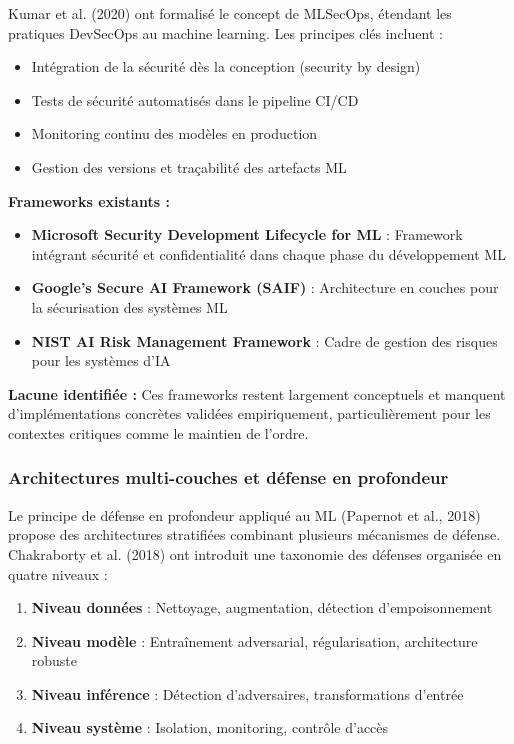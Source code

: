 Kumar et al. (2020) ont formalisé le concept de MLSecOps, étendant les pratiques DevSecOps au machine learning. Les principes clés incluent :
\begin{itemize}
    \item Intégration de la sécurité dès la conception (security by design)
    \item Tests de sécurité automatisés dans le pipeline CI/CD
    \item Monitoring continu des modèles en production
    \item Gestion des versions et traçabilité des artefacts ML
\end{itemize}

\textbf{Frameworks existants :}
\begin{itemize}
    \item \textbf{Microsoft Security Development Lifecycle for ML} : Framework intégrant sécurité et confidentialité dans chaque phase du développement ML
    \item \textbf{Google's Secure AI Framework (SAIF)} : Architecture en couches pour la sécurisation des systèmes ML
    \item \textbf{NIST AI Risk Management Framework} : Cadre de gestion des risques pour les systèmes d'IA
\end{itemize}

\textbf{Lacune identifiée :} Ces frameworks restent largement conceptuels et manquent d'implémentations concrètes validées empiriquement, particulièrement pour les contextes critiques comme le maintien de l'ordre.

\subsubsection{Architectures multi-couches et défense en profondeur}

Le principe de défense en profondeur appliqué au ML (Papernot et al., 2018) propose des architectures stratifiées combinant plusieurs mécanismes de défense. Chakraborty et al. (2018) ont introduit une taxonomie des défenses organisée en quatre niveaux :
\begin{enumerate}
    \item \textbf{Niveau données} : Nettoyage, augmentation, détection d'empoisonnement
    \item \textbf{Niveau modèle} : Entraînement adversarial, régularisation, architecture robuste
    \item \textbf{Niveau inférence} : Détection d'adversaires, transformations d'entrée
    \item \textbf{Niveau système} : Isolation, monitoring, contrôle d'accès
\end{enumerate}

